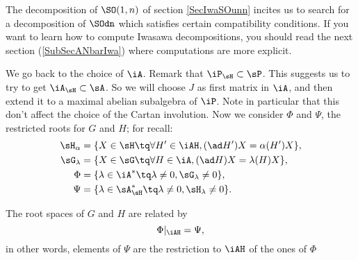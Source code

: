 The decomposition of $\SO(1,n)$ of section \ref{SecIwaSOunn} incites us to search for a decomposition of $\SOdn$ which satisfies certain compatibility conditions. If you want to learn how to compute Iwasawa decompositions, you should read the next section (\ref{SubSecANbarIwa}) where computations are more explicit.

We go back to the choice of $\iA$. Remark that $\iP_{\sH}\subset\sP$. This suggests us to try to get $\iA_{\sH}\subset\sA$. So we will choose $J$ as first matrix in $\iA$, and then extend it to a maximal abelian subalgebra of $\iP$. Note in particular that this don't affect the choice of the Cartan involution. Now we consider $\Phi$ and $\Psi$, the restricted roots for $G$ and $H$; for recall:
\begin{equation}
\begin{split}
  \sH_{\alpha}  &=\{ X\in\sH\tq \forall H'\in\iAH,(\ad H')X=\alpha(H')X \},\\
  \sG_{\lambda} &=\{ X\in\sG\tq \forall H\in\iA,(\ad H)X=\lambda(H)X \},\\
  \Phi        &=\{ \lambda\in\iA^*\tq \lambda\neq 0, \sG_{\lambda}\neq 0 \},\\
  \Psi        &=\{ \lambda\in\sA_{\sH}^*\tq \lambda\neq 0, \sH_{\lambda}\neq 0\}.
\end{split}
\end{equation}

\begin{lemma}
The root spaces of $G$ and $H$ are related by
\[
    \Phi|_{\iAH}=\Psi,
\]
in other words, elements of $\Psi$ are the restriction to $\iAH$ of the ones of $\Phi$
\end{lemma}

